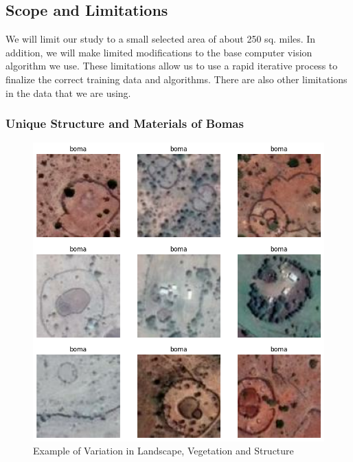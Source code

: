 \documentclass[10pt]{article}
\begin{document}








\subsection{Scope and Limitations}


We will limit our study to a small selected area of about 250 sq. miles. In addition, we will make limited modifications to the base computer vision algorithm we use. These limitations allow us to use a rapid iterative process to finalize the correct training data and algorithms. There are also other limitations in the data that we are using.




\subsubsection{Unique Structure and Materials of Bomas}

\begin{figure} [H]
    \centering
    \includegraphics[width=0.8\linewidth]{images/types of bomas.png}
    \caption{Example of Variation in Landscape, Vegetation and Structure}
    \label{fig:types_of_bomas}
\end{figure}
\end{document}

